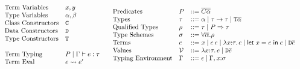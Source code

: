 \documentclass[format=acmsmall,manuscript,review,screen,nonacm,margin=1in,11pt]{acmart}
\begin{document}
\begin{figure}[ht]
    \footnotesize
  \[
  \begin{array}{l l l}
    &\text{Term Variables}     &x, y\\
    &\text{Type Variables}     &\alpha, \beta\\
    &\text{Class Constructors} &\texttt{C}\\
    &\text{Data Constructors}  &\texttt{D}\\
    &\text{Type Constructors}  &\texttt{T}\\
    \\
    &\text{Term Typing}        &P \mid \Gamma \vdash e : \tau\\
    &\text{Term Eval}          &e \rightsquigarrow e'
  \end{array}
  \begin{array}{l l l l}
    &\text{Predicates}      &P &\mathrel{{:}{:}{=}} \overline{C\overline{\alpha}}\\
    &\text{Types}           &\tau   &\mathrel{{:}{:}{=}} \alpha \mathrel{\mid} \tau\to\tau \mathrel{\mid} \texttt{T}\overline{\alpha}\\
    &\text{Qualified Types} &\rho   &\mathrel{{:}{:}{=}} \tau \mathrel{\mid} P\Rightarrow\tau\\
    &\text{Type Schemes}    &\sigma &\mathrel{{:}{:}{=}} \forall{\overline{\alpha}}.\rho\\
    &\text{Terms}           &e    &\mathrel{{:}{:}{=}} x \mathrel{\mid} e\, e \mathrel{\mid} \lambda x{:}\tau.\, e \mathrel{\mid} \mathsf{let}\;x = e\;\mathsf{in}\;e
                                      \mathrel{\mid} \texttt{D}\overline{e}\\
    &\text{Values}          &\mathcal{V}   &\mathrel{{:}{:}{=}} \lambda x{:}\tau.\, e \mathrel{\mid} \texttt{D}\overline{e}\\
    &\text{Typing Environment} &\Gamma &\mathrel{{:}{:}{=}} \epsilon \mathrel{\mid} \Gamma,x{:}\sigma
  \end{array}
  \]
  \caption{\TCFD}
  \label{fig:ty-fd-formal}
\end{figure}
\end{document}
